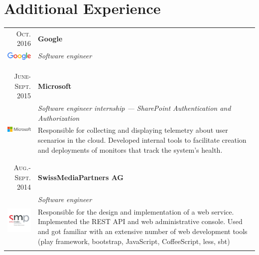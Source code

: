\documentclass[a4paper,11pt]{article} %
\begin{document}
\pagebreak
{}



\section{Additional Experience}

\begin{tabularx}{\textwidth}{r|X}

\textsc{Oct. 2016} & \textbf{Google} \\
\multirow{2}{*}{ \includegraphics[width=60pt]{img/google.eps}}
& \emph{Software engineer}\\ 
& \footnotesize{}\\
\multicolumn{2}{c}{} \\
\\


\textsc{June-Sept. 2015} & \textbf{Microsoft} \\
\multirow{2}{*}{ \includegraphics[width=60pt]{img/microsoft.eps}}
& \emph{Software engineer internship --- SharePoint Authentication and Authorization}\\ 
& \footnotesize{Responsible for collecting and displaying telemetry about user
scenarios in the cloud. Developed internal tools to facilitate creation and deployments
of monitors that track the system's health.}\\
\multicolumn{2}{c}{} \\
\\


\textsc{Aug.-Sept. 2014} & \textbf{SwissMediaPartners AG} \\
\multirow{4}{*}{ \includegraphics[width=60pt]{img/smp.jpg}}
& \emph{Software engineer}\\ 
& \footnotesize{Responsible for the design and implementation of a web
service. Implemented the REST API and web administrative console. Used
and got familiar with an extensive number of web development tools (play
framework, bootstrap, JavaScript, CoffeeScript, less, sbt)}\\ 
\multicolumn{2}{c}{} \\


\end{tabularx}
\end{document}

